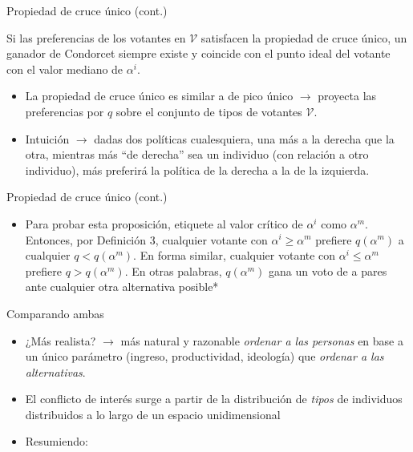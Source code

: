 \documentclass[
  ignorenonframetext,
]{beamer}
\providecommand{\tightlist}{%
  \setlength{\itemsep}{0pt}\setlength{\parskip}{0pt}}\usepackage{longtable,booktabs,array}
\begin{document}
\begin{frame}
\begin{block}{Propiedad de cruce único (cont.)}
\protect\hypertarget{propiedad-de-cruce-uxfanico-cont.}{}
\begin{tcolorbox}[enhanced jigsaw, titlerule=0mm, breakable, colback=white, left=2mm, coltitle=black, toptitle=1mm, leftrule=.75mm, opacityback=0, bottomtitle=1mm, opacitybacktitle=0.6, colbacktitle=quarto-callout-tip-color!10!white, title={Proposición 2}, toprule=.15mm, colframe=quarto-callout-tip-color-frame, rightrule=.15mm, arc=.35mm, bottomrule=.15mm]

Si las preferencias de los votantes en \(\mathcal{V}\) satisfacen la
propiedad de cruce único, un ganador de Condorcet siempre existe y
coincide con el punto ideal del votante con el valor mediano de
\(\alpha^{i}\).

\end{tcolorbox}

\begin{itemize}
\tightlist
\item
  La propiedad de cruce único es similar a de pico único
  \(\longrightarrow\) proyecta las preferencias por \(q\) sobre el
  conjunto de tipos de votantes \(\mathcal{V}\).
\item
  Intuición \(\longrightarrow\) dadas dos políticas cualesquiera, una
  más a la derecha que la otra, mientras más ``de derecha'' sea un
  individuo (con relación a otro individuo), más preferirá la política
  de la derecha a la de la izquierda.
\end{itemize}
\end{block}

\begin{block}{Propiedad de cruce único (cont.)}
\protect\hypertarget{propiedad-de-cruce-uxfanico-cont.-1}{}
\begin{itemize}
\tightlist
\item
  Para probar esta proposición, etiquete al valor crítico de
  \(\alpha^{i}\) como \(\alpha^{m}\). Entonces, por Definición 3,
  cualquier votante con \(\alpha^{i} \geq \alpha^{m}\) prefiere
  \(q(\alpha^{m})\) a cualquier \(q < q(\alpha^{m})\). En forma similar,
  cualquier votante con \(\alpha^{i} \leq \alpha^{m}\) prefiere
  \(q > q(\alpha^{m})\). En otras palabras, \(q(\alpha^{m})\) gana un
  voto de a pares ante cualquier otra alternativa posible*
\end{itemize}
\end{block}

\begin{block}{Comparando ambas}
\protect\hypertarget{comparando-ambas}{}
\begin{itemize}
\tightlist
\item
  ¿Más realista? \(\longrightarrow\) más natural y razonable
  \emph{ordenar a las personas} en base a un único parámetro (ingreso,
  productividad, ideología) que \emph{ordenar a las alternativas}.
\item
  El conflicto de interés surge a partir de la distribución de
  \emph{tipos} de individuos distribuidos a lo largo de un espacio
  unidimensional
\item
  Resumiendo:


\end{itemize}
\end{block}
\end{frame}
\end{document}
